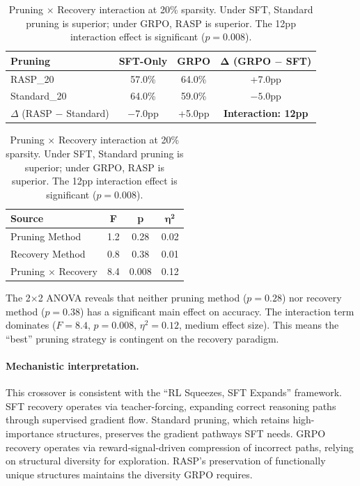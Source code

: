 \documentclass[11pt]{article}
\begin{document}
\begin{table}[t]
\centering
\caption{Pruning $\times$ Recovery interaction at 20\% sparsity. Under SFT, Standard pruning is superior; under GRPO, RASP is superior. The 12pp interaction effect is significant ($p{=}0.008$).}
\label{tab:interaction}
\begin{tabular}{lccc}
\toprule
\textbf{Pruning} & \textbf{SFT-Only} & \textbf{GRPO} & $\boldsymbol{\Delta}$ \textbf{(GRPO $-$ SFT)} \\
\midrule
RASP\_20 & 57.0\% & 64.0\% & +7.0pp \\
Standard\_20 & 64.0\% & 59.0\% & $-5.0$pp \\
\midrule
$\Delta$ (RASP $-$ Standard) & $-7.0$pp & +5.0pp & \textbf{Interaction: 12pp} \\
\bottomrule
\end{tabular}
\vspace{0.3em}

\begin{tabular}{lccc}
\toprule
\textbf{Source} & \textbf{F} & \textbf{p} & $\boldsymbol{\eta^2}$ \\
\midrule
Pruning Method & 1.2 & 0.28 & 0.02 \\
Recovery Method & 0.8 & 0.38 & 0.01 \\
Pruning $\times$ Recovery & 8.4 & 0.008 & 0.12 \\
\bottomrule
\end{tabular}
\end{table}

The 2$\times$2 ANOVA reveals that neither pruning method ($p{=}0.28$) nor recovery method ($p{=}0.38$) has a significant main effect on accuracy. The interaction term dominates ($F{=}8.4$, $p{=}0.008$, $\eta^2{=}0.12$, medium effect size). This means the ``best'' pruning strategy is contingent on the recovery paradigm.

\paragraph{Mechanistic interpretation.} This crossover is consistent with the ``RL Squeezes, SFT Expands'' framework. SFT recovery operates via teacher-forcing, expanding correct reasoning paths through supervised gradient flow. Standard pruning, which retains high-importance structures, preserves the gradient pathways SFT needs. GRPO recovery operates via reward-signal-driven compression of incorrect paths, relying on structural diversity for exploration. RASP's preservation of functionally unique structures maintains the diversity GRPO requires.
\end{document}
